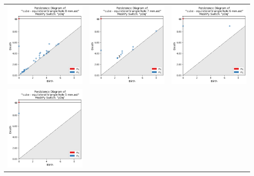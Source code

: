 \documentclass[ma]{uncgdissertationexp}
\theoremstyle{plain}
\theoremstyle{definition}
\theoremstyle{remark}
\begin{document}
\begin{table}[H]
\begin{center}
    \begin{tabular}{ccc}
         \includegraphics[width=2in]{Final Run, (cube - equilateral triangle hole 8 mm) persdia.png} &
         \includegraphics[width=2in]{Final Run, (cube - equilateral triangle hole 7 mm) persdia.png} &  
         \includegraphics[width=2in]{Final Run, (cube - equilateral triangle hole 6 mm) persdia.png} \\
         \includegraphics[width=2in]{Final Run, (cube - equilateral triangle hole 5 mm) persdia.png} & 

\end{tabular}
\end{center}
\end{table}
\end{document}
